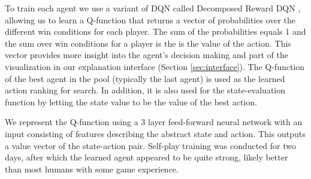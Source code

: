 \documentclass{article}
\begin{document}
To train each agent we use a variant of DQN \cite{mnih2015} called Decomposed Reward DQN \cite{juozapaitis2019}, allowing us to learn a Q-function that returns a vector of probabilities over the different win conditions for each player. The sum of the probabilities equals 1 and the sum over win conditions for a player is the is the value of the action. This vector provides more insight into the agent's decision making and part of the visualization in our explanation interface (Section \ref{sec:interface}). The Q-function of the best agent in the pool (typically the last agent) is used as the learned action ranking for search. In addition, it is also used for the state-evaluation function by letting the state value to be the value of the best action. 

We represent the Q-function using a 3 layer feed-forward neural network with an input consisting of features describing the abstract state and action. This outputs a value vector of the state-action pair. Self-play training was conducted for two days, after which the learned agent appeared to be quite strong, likely better than most humans with some game experience. 





\end{document}
